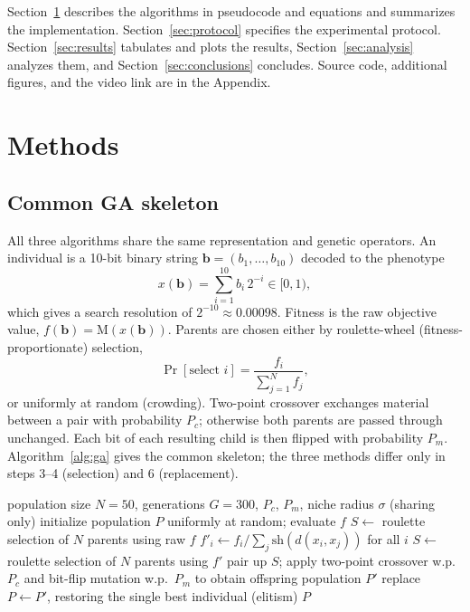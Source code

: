 \documentclass[conference]{IEEEtran}
\begin{document}
Section~\ref{sec:methods} describes the algorithms in pseudocode and equations
and summarizes the implementation. Section~\ref{sec:protocol} specifies the
experimental protocol. Section~\ref{sec:results} tabulates and plots the
results, Section~\ref{sec:analysis} analyzes them, and
Section~\ref{sec:conclusions} concludes. Source code, additional figures, and
the video link are in the Appendix.

\section{Methods}
\label{sec:methods}

\subsection{Common GA skeleton}
\label{sec:skeleton}

All three algorithms share the same representation and genetic operators. An
individual is a 10-bit binary string $\mathbf{b} = (b_1,\ldots,b_{10})$
decoded to the phenotype
\begin{equation}
x(\mathbf{b}) = \sum_{i=1}^{10} b_i \, 2^{-i} \in [0,1),
\label{eq:decode}
\end{equation}
which gives a search resolution of $2^{-10} \approx 0.00098$. Fitness is the
raw objective value, $f(\mathbf{b}) = \mathrm{M}(x(\mathbf{b}))$.
Parents are chosen either by roulette-wheel (fitness-proportionate) selection,
\begin{equation}
\Pr[\text{select } i] = \frac{f_i}{\sum_{j=1}^{N} f_j},
\label{eq:roulette}
\end{equation}
or uniformly at random (crowding). Two-point crossover exchanges material
between a pair with probability $P_c$; otherwise both parents are passed
through unchanged. Each bit of each resulting child is then flipped with
probability $P_m$. Algorithm~\ref{alg:ga} gives the common skeleton; the three
methods differ only in steps 3--4 (selection) and 6 (replacement).

\begin{algorithm}[t]
\caption{Standard / sharing GA (generational replacement)}
\label{alg:ga}
\begin{algorithmic}[1]
\REQUIRE population size $N=50$, generations $G=300$, $P_c$, $P_m$,
  niche radius $\sigma$ (sharing only)
\STATE initialize population $P$ uniformly at random; evaluate $f$
    \STATE $S \leftarrow$ roulette selection of $N$ parents using raw $f$
  \ELSE
    \STATE $f'_i \leftarrow f_i / \sum_j \mathrm{sh}(d(x_i,x_j))$
      for all $i$ 
    \STATE $S \leftarrow$ roulette selection of $N$ parents using $f'$
  \ENDIF
  \STATE pair up $S$; apply two-point crossover w.p.\ $P_c$ and bit-flip
    mutation w.p.\ $P_m$ to obtain offspring population $P'$
  \STATE replace $P \leftarrow P'$, restoring the single best individual
    (elitism) 
\ENDFOR
\RETURN $P$
\end{algorithmic}
\end{algorithm}
\end{document}
